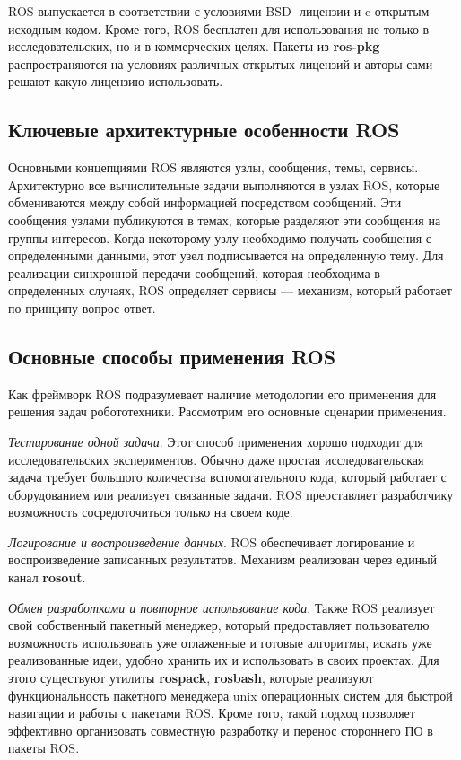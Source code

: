 \documentclass[10pt, a5paper]{article}
\begin{document}
ROS выпускается в соответствии с условиями BSD- лицензии и c открытым исходным кодом. Кроме того, ROS бесплатен для использования не только в исследовательских, но и в коммерческих целях. Пакеты из \textbf{ros-pkg} распространяются на условиях различных открытых лицензий и авторы сами решают какую лицензию использовать.

\subsection*{Ключевые архитектурные особенности ROS}

Основными концепциями ROS являются узлы, сообщения, темы, сервисы. Архитектурно все вычислительные задачи выполняются в узлах ROS, которые обмениваются между собой информацией посредством сообщений. Эти сообщения узлами публикуются в темах, которые разделяют эти сообщения на группы интересов. Когда некоторому узлу необходимо получать сообщения с определенными данными, этот узел подписывается на определенную тему. Для реализации синхронной передачи сообщений, которая необходима в определенных случаях, ROS определяет сервисы — механизм, который работает по принципу вопрос-ответ.

\subsection*{Основные способы применения ROS}

Как фреймворк ROS подразумевает наличие методологии его применения для решения задач робототехники.%
Рассмотрим его основные сценарии применения.

\emph{Тестирование одной задачи}. Этот способ применения хорошо подходит для исследовательских экспериментов. Обычно даже простая исследовательская задача требует большого количества вспомогательного кода, который работает с оборудованием или реализует связанные задачи. ROS преоставляет разработчику возможность сосредоточиться только на своем коде.

\emph{Логирование и воспроизведение данных}. ROS обеспечивает логирование и воспроизведение записанных результатов. Механизм реализован через единый канал \textbf{rosout}.

\emph{Обмен разработками и повторное использование кода}. Также ROS реализует свой собственный пакетный менеджер, который пре\-доставляет пользователю возможность использовать уже отлаженные и готовые алгоритмы, искать уже реализованные идеи, удобно хранить их и использовать в своих проектах. Для этого существуют утилиты \textbf{rospack}, \textbf{rosbash}, которые реализуют функциональность пакетного менеджера unix операционных систем для быстрой навигации и работы с пакетами ROS. Кроме того, такой подход позволяет эффективно организовать совместную разработку и перенос стороннего ПО в пакеты ROS.
\end{document}
